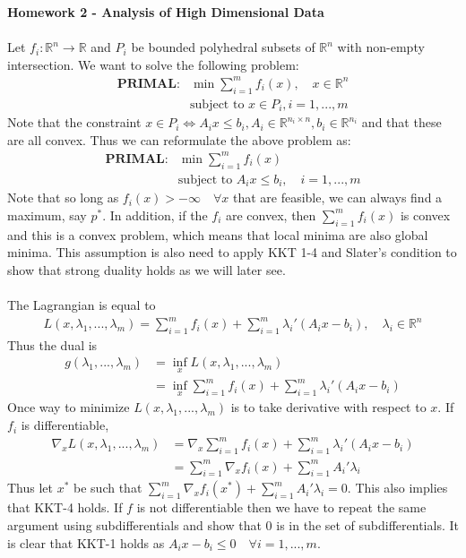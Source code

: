 \documentclass[12pt, leqno]{article}
\begin{document}
\pagestyle{fancy}

\begin{center}
{\large {\bf Homework 2 - Analysis of High Dimensional Data}} \\
\end{center}

\paragraph{} Let $f_i: \mathbb{R}^n \to \mathbb{R}$ and $P_i$ be
bounded polyhedral subsets of $\mathbb{R}^n$ with non-empty intersection. We want to solve
the following problem:
\begin{align*}
\textbf{PRIMAL:}&
\min \sum_{i=1}^m f_i(x), \quad x \in \mathbb{R}^n\\
&\text{subject to } x \in P_i, i = 1,...,m
\end{align*}
Note that the constraint $x \in P_i \iff A_ix \leq b_i, A_i \in
\mathbb{R}^{n_i \times n}, b_i \in \mathbb{R}^{n_i}$ and that these
are all convex. Thus we can
reformulate the above problem as:
\begin{align*}
\textbf{PRIMAL:}&
\min \sum_{i=1}^m f_i(x) \\
&\text{subject to } A_ix \leq b_i, \quad i = 1,...,m
\end{align*}
Note that so long as $f_i(x) > -\infty \quad \forall x$ that are
feasible, we can always find a maximum, say $p^*$. In addition, if the $f_i$ are convex, then $\sum_{i=1}^m f_i(x)$ is
convex and this is a convex problem, which means that local minima are
also global minima. This assumption is also need to apply KKT 1-4 and
Slater's condition to show that strong duality holds as we will later see.
\paragraph{} The Lagrangian is equal to 
\begin{align*}
L(x,\lambda_1,...,\lambda_m) = \sum_{i=1}^m f_i(x) + \sum_{i=1}^m
  \lambda_i' (A_ix - b_i), \quad \lambda_i \in \mathbb{R}^n
\end{align*}
Thus the dual is 
\begin{align*}
g(\lambda_1,...,\lambda_m) &= \inf_{x} L(x,\lambda_1,...,\lambda_m) \\
&= \inf_{x} \sum_{i=1}^m f_i(x) + \sum_{i=1}^m
  \lambda_i' (A_ix - b_i)
\end{align*}
Once way to minimize $L(x,\lambda_1,...,\lambda_m)$ is to take
derivative with respect to $x$. If $f_i$ is differentiable, 
\begin{align*}
\nabla_x
L(x,\lambda_1,...,\lambda_m) &= \nabla_x \sum_{i=1}^m f_i(x) + \sum_{i=1}^m
  \lambda_i' (A_ix - b_i) \\
&= \sum_{i=1}^m \nabla_x f_i(x) + \sum_{i=1}^m A_i' \lambda_i
\end{align*}
Thus let $x^*$ be such that $ \sum_{i=1}^m \nabla_x f_i(x^*) +
\sum_{i=1}^m A_i' \lambda_i = 0$. This also implies
that KKT-4 holds. If $f$ is not differentiable then
we have to repeat the same argument using subdifferentials and show
that $0$ is in the set of subdifferentials. It is clear that KKT-1
holds as $A_ix - b_i \leq 0 \quad \forall i=1,...,m$. 
\end{document}
